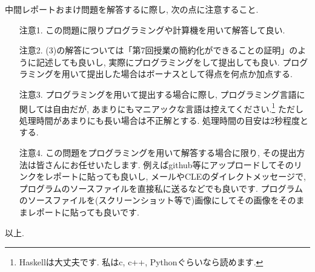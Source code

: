 \documentclass[dvipdfmx,a4paper,11pt]{article}
\theoremstyle{definition}
\begin{document}
\vspace{11pt}
中間レポートおまけ問題を解答するに際し, 次の点に注意すること.
\begin{enumerate}
\item[注意1.]  この問題に限りプログラミングや計算機を用いて解答して良い. %
\item[注意2.] (3)の解答については「第7回授業の簡約化ができることの証明」のように記述しても良いし, 実際にプログラミングをして提出しても良い. プログラミングを用いて提出した場合はボーナスとして得点を何点か加点する. 
\item[注意3.]プログラミングを用いて提出する場合に際し, プログラミング言語に関しては自由だが, あまりにもマニアックな言語は控えてください.\footnote{Haskellは大丈夫です. 私はc, c++, Pythonぐらいなら読めます.} ただし処理時間があまりにも長い場合は不正解とする. 処理時間の目安は2秒程度とする. 
\item[注意4.] この問題をプログラミングを用いて解答する場合に限り, その提出方法は皆さんにお任せいたします. 例えばgithub等にアップロードしてそのリンクをレポートに貼っても良いし, メールやCLEのダイレクトメッセージで, プログラムのソースファイルを直接私に送るなどでも良いです. プログラムのソースファイルを(スクリーンショット等で)画像にしてその画像をそのままレポートに貼っても良いです. \\
\end{enumerate}

     \vspace{33pt} 
     
 \begin{flushright}
 {\LARGE 以上.}
 \end{flushright}



 
\end{document}

